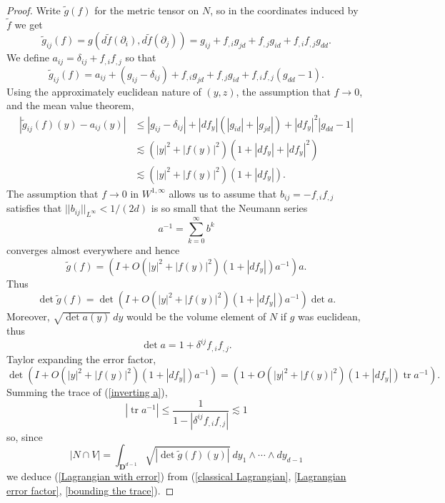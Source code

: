 \documentclass[reqno,12pt,letterpaper]{amsart}
\newcommand{\DD}{\mathbf{D}}
\newcommand{\tr}{\operatorname{tr}}
\theoremstyle{definition}
\numberwithin{equation}{section}
\begin{document}
\begin{proof}
Write $\tilde g(f)$ for the metric tensor on $N$, so in the coordinates induced by $\tilde f$ we get
$$\tilde g_{ij}(f) = g(d\tilde f(\partial_i), d\tilde f(\partial_j)) = g_{ij} + f_{,i}g_{jd} + f_{,j}g_{id} + f_{,i}f_{,j} g_{dd}.$$
We define $a_{ij} = \delta_{ij} + f_{,i}f_{,j}$ so that
$$\tilde g_{ij}(f) = a_{ij} + (g_{ij} - \delta_{ij}) + f_{,i}g_{jd} + f_{,j}g_{id} + f_{,i}f_{,j}(g_{dd} - 1).$$
Using the approximately euclidean nature of $(y, z)$, the assumption that $f \to 0$, and the mean value theorem,
\begin{align*}
|\tilde g_{ij}(f)(y) - a_{ij}(y)| &\leq |g_{ij} - \delta_{ij}| + |df_y|(|g_{id}| + |g_{jd}|) + |df_y|^2 |g_{dd} - 1|\\
&\lesssim (|y|^2 + |f(y)|^2)(1 + |df_y| + |df_y|^2)\\
&\lesssim (|y|^2 + |f(y)|^2)(1 + |df_y|).
\end{align*}
The assumption that $f \to 0$ in $W^{1, \infty}$ allows us to assume that $b_{ij} = -f_{,i}f_{,j}$ satisfies that $||b_{ij}||_{L^\infty} < 1/(2d)$ is so small that the Neumann series
\begin{equation}\label{inverting a}
a^{-1} = \sum_{k=0}^\infty b^k
\end{equation}
converges almost everywhere and hence
$$\tilde g(f) = (I + O(|y|^2 + |f(y)|^2)(1 + |df_y|)a^{-1})a.$$
Thus
$$\det \tilde g(f) = \det(I + O(|y|^2 + |f(y)|^2)(1 + |df_y|)a^{-1}) \det a.$$
Moreover, $\sqrt{\det a(y)} ~dy$ would be the volume element of $N$ if $g$ was euclidean, thus
\begin{equation}\label{classical Lagrangian}
\det a = 1 + \delta^{ij} f_{,i} f_{,j}.
\end{equation}
Taylor expanding the error factor,
\begin{equation}\label{Lagrangian error factor}
\det(I + O(|y|^2 + |f(y)|^2)(1 + |df_y|)a^{-1}) = (1 + O(|y|^2 + |f(y)|^2)(1 + |df_y|) \tr a^{-1}).
\end{equation}
Summing the trace of (\ref{inverting a}),
\begin{equation}\label{bounding the trace}
|\tr a^{-1}| \leq \frac{1}{1 - |\delta^{ij} f_{,i}f_{,j}|} \lesssim 1
\end{equation}
so, since
$$|N \cap V| = \int_{\DD^{d - 1}} \sqrt{|\det \tilde g(f)(y)|} ~dy_1 \wedge \cdots \wedge dy_{d - 1}$$
we deduce (\ref{Lagrangian with error}) from (\ref{classical Lagrangian}, \ref{Lagrangian error factor}, \ref{bounding the trace}).
\end{proof}
\end{document}
